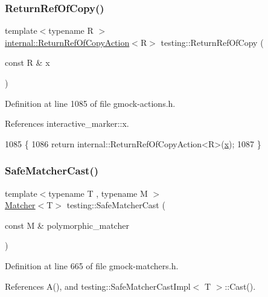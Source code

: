 \subsubsection{\texorpdfstring{Return\+Ref\+Of\+Copy()}{ReturnRefOfCopy()}}
{\footnotesize\ttfamily template$<$typename R $>$ \\
\hyperlink{classtesting_1_1internal_1_1ReturnRefOfCopyAction}{internal\+::\+Return\+Ref\+Of\+Copy\+Action}$<$R$>$ testing\+::\+Return\+Ref\+Of\+Copy (\begin{DoxyParamCaption}\item[{const R \&}]{x }\end{DoxyParamCaption})\hspace{0.3cm}{\ttfamily [inline]}}



Definition at line 1085 of file gmock-\/actions.\+h.



References interactive\+\_\+marker\+::x.


\begin{DoxyCode}
1085                                                                     \{
1086   \textcolor{keywordflow}{return} internal::ReturnRefOfCopyAction<R>(\hyperlink{namespaceinteractive__marker_acda52804aef30b460a72fb21ee01d69d}{x});
1087 \}
\end{DoxyCode}
\mbox{\label{namespacetesting_ac016ac22aa065a19b9ef95f0ccffc17b}} 
\subsubsection{\texorpdfstring{Safe\+Matcher\+Cast()}{SafeMatcherCast()}}
{\footnotesize\ttfamily template$<$typename T , typename M $>$ \\
\hyperlink{classtesting_1_1Matcher}{Matcher}$<$T$>$ testing\+::\+Safe\+Matcher\+Cast (\begin{DoxyParamCaption}\item[{const M \&}]{polymorphic\+\_\+matcher }\end{DoxyParamCaption})\hspace{0.3cm}{\ttfamily [inline]}}



Definition at line 665 of file gmock-\/matchers.\+h.



References A(), and testing\+::\+Safe\+Matcher\+Cast\+Impl$<$ T $>$\+::\+Cast().


